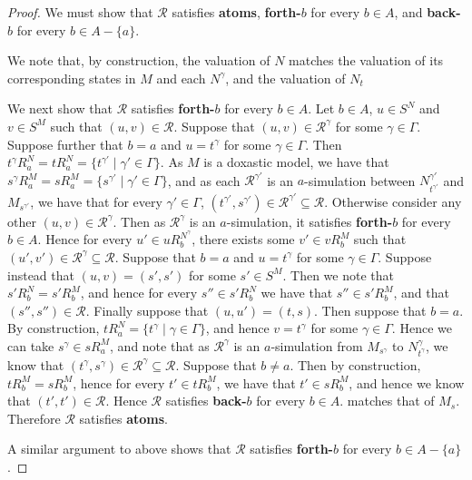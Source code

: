 \begin{proof}
We must show that $\mathcal{R}$ satisfies {\bf atoms}, {\bf forth-$b$} for every
$b \in A$, and {\bf back-$b$} for every $b \in A - \{a\}$.

We note that, by construction, the valuation of $N$ matches the valuation of its
corresponding states in $M$ and each $N^\gamma$, and the valuation of $N_t$

We next show that $\mathcal{R}$ satisfies {\bf forth-$b$} for every $b \in A$.
Let $b \in A$, $u \in S^N$ and $v \in S^M$ such that $(u, v) \in \mathcal{R}$.
Suppose that $(u, v) \in \mathcal{R}^\gamma$ for some $\gamma \in \Gamma$.
Suppose further that $b = a$ and $u = t^\gamma$ for some $\gamma \in \Gamma$.
Then $t^\gamma R^N_a = tR^N_a = \{t^{\gamma'} \mid \gamma' \in \Gamma\}$.  As
$M$ is a doxastic model, we have that $s^\gamma R^M_a = sR^M_a = \{s^{\gamma'}
\mid \gamma' \in \Gamma\}$, and as each $\mathcal{R}^{\gamma'}$ is an
$a$-simulation between $N^{\gamma'}_{t^{\gamma'}}$ and $M_{s^{\gamma'}}$, we
have that for every $\gamma' \in \Gamma$, $(t^{\gamma'}, s^{\gamma'}) \in
\mathcal{R}^{\gamma'} \subseteq \mathcal{R}$. Otherwise consider any other $(u,
v) \in \mathcal{R}^\gamma$.  Then as $\mathcal{R}^\gamma$ is an $a$-simulation,
it satisfies {\bf forth-$b$} for every $b \in A$. Hence for every $u' \in
uR^{N^\gamma}_b$, there exists some $v' \in vR^M_b$ such that $(u', v') \in
\mathcal{R}^\gamma \subseteq \mathcal{R}$. Suppose that $b = a$ and $u =
t^\gamma$ for some $\gamma \in \Gamma$.  Suppose instead that $(u, v) = (s',
s')$ for some $s' \in S^M$.  Then we note that $s'R^N_b = s'R^M_b$, and hence
for every $s'' \in s'R^N_b$ we have that $s'' \in s'R^M_b$, and that $(s'', s'')
\in \mathcal{R}$. Finally suppose that $(u, u') = (t, s)$. Then suppose that $b
= a$. By construction, $tR^N_a = \{t^\gamma \mid \gamma \in \Gamma\}$, and hence
$v = t^\gamma$ for some $\gamma \in \Gamma$. Hence we can take $s^\gamma \in
sR^M_a$, and note that as $\mathcal{R}^\gamma$ is an $a$-simulation from
$M_{s^\gamma}$ to $N^\gamma_{t^\gamma}$, we know that $(t^\gamma, s^\gamma) \in
\mathcal{R}^\gamma \subseteq \mathcal{R}$. Suppose that $b \neq a$. Then by
construction, $tR^M_b = sR^M_b$, hence for every $t' \in tR^M_b$, we have that
$t' \in sR^M_b$, and hence we know that $(t', t') \in \mathcal{R}$. Hence
$\mathcal{R}$ satisfies {\bf back-$b$} for every $b \in A$.
matches that of $M_s$. Therefore $\mathcal{R}$ satisfies {\bf atoms}.

A similar argument to above shows that $\mathcal{R}$ satisfies {\bf forth-$b$}
for every $b \in A - \{a\}$.


\end{proof}
